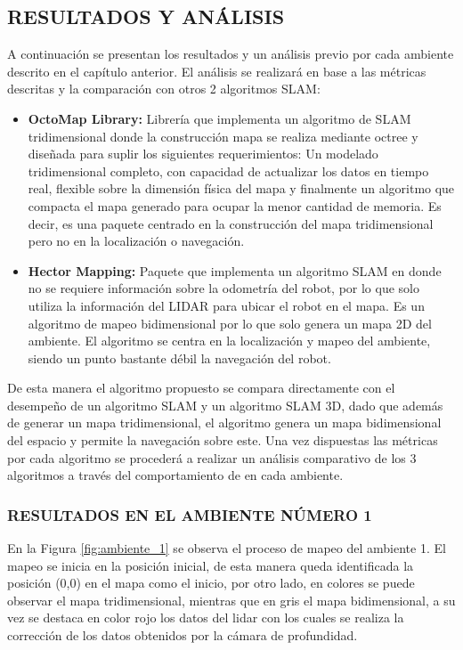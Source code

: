 \subsection{RESULTADOS Y ANÁLISIS}
A continuación se presentan los resultados y un análisis previo por cada ambiente descrito en el capítulo anterior. El análisis se realizará en base a las métricas descritas y la comparación con otros 2 algoritmos SLAM:
\begin{itemize}
    \item \textbf{OctoMap Library:} Librería que implementa un algoritmo de SLAM tridimensional donde la construcción mapa se realiza mediante octree y diseñada para suplir los siguientes requerimientos: Un modelado tridimensional completo, con capacidad de actualizar los datos en tiempo real, flexible sobre la dimensión física del mapa y finalmente un algoritmo que compacta el mapa generado para ocupar la menor cantidad de memoria. Es decir, es una paquete centrado en la construcción del mapa tridimensional pero no en la localización o navegación.
    \item \textbf{Hector Mapping:} Paquete que implementa un algoritmo SLAM en donde no se requiere información sobre la odometría del robot, por lo que solo utiliza la información del LIDAR para ubicar el robot en el mapa. Es un algoritmo de mapeo bidimensional por lo que solo genera un mapa 2D del ambiente. El algoritmo se centra en la localización y mapeo del ambiente, siendo un punto bastante débil la navegación del robot.
\end{itemize}

De esta manera el algoritmo propuesto se compara directamente con el desempeño de un algoritmo SLAM y un algoritmo SLAM 3D, dado que además de generar un mapa tridimensional, el algoritmo genera un mapa bidimensional del espacio y permite la navegación sobre este. Una vez dispuestas las métricas por cada algoritmo se procederá a realizar un análisis comparativo de los 3 algoritmos a través del comportamiento de en cada ambiente.

\subsubsection{RESULTADOS EN EL AMBIENTE NÚMERO 1}

En la Figura \ref{fig:ambiente_1} se observa el proceso de mapeo del ambiente 1. El mapeo se inicia en la posición inicial, de esta manera queda identificada la posición (0,0) en el mapa como el inicio, por otro lado, en colores se puede observar el mapa tridimensional, mientras que en gris el mapa bidimensional, a su vez se destaca en color rojo los datos del lidar con los cuales se realiza la corrección de los datos obtenidos por la cámara de profundidad. 


